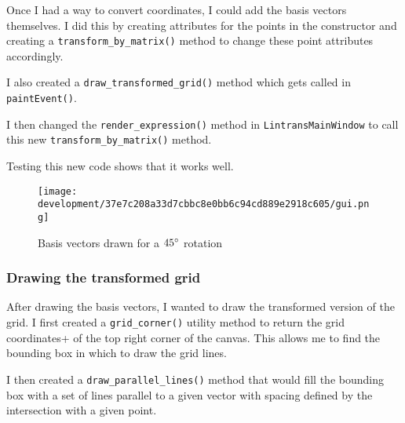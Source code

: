 \documentclass[../main.tex]{subfiles}
\begin{document}

Once I had a way to convert coordinates, I could add the basis vectors themselves. I did this by creating attributes for the points in the constructor and creating a \texttt{transform\_by\_matrix()} method to change these point attributes accordingly.


I also created a \texttt{draw\_transformed\_grid()} method which gets called in \texttt{paintEvent()}.


I then changed the \texttt{render\_expression()} method in \texttt{LintransMainWindow} to call this new \texttt{transform\_by\_matrix()} method.


Testing this new code shows that it works well.

\begin{figure}[H]
	\centering
	\texttt{[image: development/37e7c208a33d7cbbc8e0bb6c94cd889e2918c605/gui.png]}
	\caption{Basis vectors drawn for a $45\degree$ rotation}
	\label{fig:development:37e7c208a33d7cbbc8e0bb6c94cd889e2918c605:gui.png}
\end{figure}

\subsubsection{Drawing the transformed grid\label{development:visualizing-matrices:drawing-the-transformed-grid}}

After drawing the basis vectors, I wanted to draw the transformed version of the grid. I first created a \texttt{grid\_corner()} utility method to return the grid coordinates+ of the top right corner of the canvas. This allows me to find the bounding box in which to draw the grid lines.


I then created a \texttt{draw\_parallel\_lines()} method that would fill the bounding box with a set of lines parallel to a given vector with spacing defined by the intersection with a given point.
\end{document}
